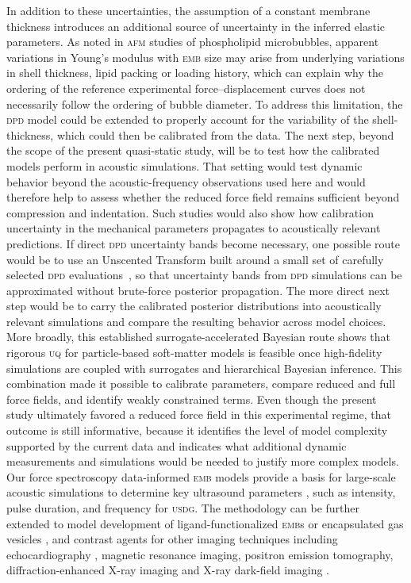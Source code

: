 \documentclass[%
 aip,
 jcp,
 amsmath,amssymb,
 preprint,%
]{revtex4-1}
\begin{document}
In addition to these uncertainties, the assumption of a constant membrane thickness introduces an additional source of uncertainty in the inferred elastic parameters. As noted in \textsc{afm} studies of phospholipid microbubbles, apparent variations in Young's modulus with \textsc{emb} size may arise from underlying variations in shell thickness, lipid packing or loading history, which can explain why the ordering of the reference experimental force--displacement curves does not necessarily follow the ordering of bubble diameter. To address this limitation, the \textsc{dpd} model could be extended to properly account for the variability of the shell-thickness, which could then be calibrated from the data. The next step, beyond the scope of the present quasi-static study, will be to test how the calibrated models perform in acoustic simulations. That setting would test dynamic behavior beyond the acoustic-frequency observations used here and would therefore help to assess whether the reduced force field remains sufficient beyond compression and indentation. Such studies would also show how calibration uncertainty in the mechanical parameters propagates to acoustically relevant predictions. If direct \textsc{dpd} uncertainty bands become necessary, one possible route would be to use an Unscented Transform built around a small set of carefully selected \textsc{dpd} evaluations~\cite{julier2002reduced}, so that uncertainty bands from \textsc{dpd} simulations can be approximated without brute-force posterior propagation. The more direct next step would be to carry the calibrated posterior distributions into acoustically relevant simulations and compare the resulting behavior across model choices. More broadly, this established surrogate-accelerated Bayesian route shows that rigorous \textsc{uq} for particle-based soft-matter models is feasible once high-fidelity simulations are coupled with surrogates and hierarchical Bayesian inference. This combination made it possible to calibrate parameters, compare reduced and full force fields, and identify weakly constrained terms. Even though the present study ultimately favored a reduced force field in this experimental regime, that outcome is still informative, because it identifies the level of model complexity supported by the current data and indicates what additional dynamic measurements and simulations would be needed to justify more complex models. Our force spectroscopy data-informed \textsc{emb} models provide a basis for large-scale acoustic simulations to determine key ultrasound parameters \cite{lah2025open}, such as intensity, pulse duration, and frequency for \textsc{usdg}. The methodology can be further extended to model development of ligand-functionalized \textsc{emb}s or encapsulated gas vesicles \cite{maresca2018biomolecular,salahshoor2022geometric,dutka2023structure,smith2025ultrafast,ntarakas2025dissipative}, and contrast agents for other imaging techniques including echocardiography \cite{kaufmann2007contrast}, magnetic resonance imaging, positron emission tomography, diffraction-enhanced X-ray imaging \cite{kogan2010microbubbles} and X-ray dark-field imaging \cite{velroyen2013microbubbles}.
\end{document}
